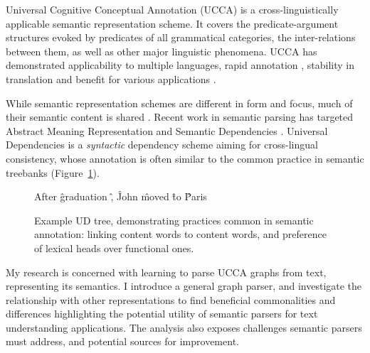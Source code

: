 \documentclass[12pt,a4paper]{report}
\begin{document}
Universal Cognitive Conceptual Annotation (UCCA)
is a cross-linguistically applicable semantic representation scheme.
It covers the predicate-argument
structures evoked by predicates of all grammatical categories, the inter-relations between them,
as well as other major linguistic phenomena.
UCCA has demonstrated applicability to multiple languages,
rapid annotation \citep{abend2017uccaapp},
stability in translation \citep{sulem2015conceptual}
and benefit for various applications
\citep{birch2016hume,choshen2018usim,sulem2018samsa,sulem2018simple}.

While semantic representation schemes are different in form and focus,
much of their semantic content is shared \citep{abend2017state}.
Recent work in semantic parsing has targeted
Abstract Meaning Representation \citep{banarescu2013abstract} and
Semantic Dependencies \citep{oepen2016towards}.
Universal Dependencies \citep{nivre2016universal}
is a \textit{syntactic} dependency scheme aiming for cross-lingual consistency,
whose annotation is often similar to the common practice in semantic treebanks
(Figure~\ref{fig:original_example_ud}).

\begin{figure}[t]
  \centering
    \begin{dependency}[text only label, label style={above,font=\tt}, font=\small]
    \begin{deptext}[column sep=.8em,ampersand replacement=\^]
    After \^ graduation \^ , \^ John \^ moved \^ to \^ Paris \\
    \end{deptext}
    \end{dependency}
\caption{Example UD tree, demonstrating practices common in semantic annotation:
linking content words to content words, and preference of lexical heads over functional ones.
\label{fig:original_example_ud}}
\end{figure}

My research is concerned with learning to parse UCCA graphs from text, representing its semantics.
I introduce a general graph parser,
and investigate the relationship with other representations to find beneficial commonalities and
differences highlighting the potential utility of semantic parsers for text understanding applications.
The analysis also exposes challenges semantic parsers must address,
and potential sources for improvement.
\end{document}
